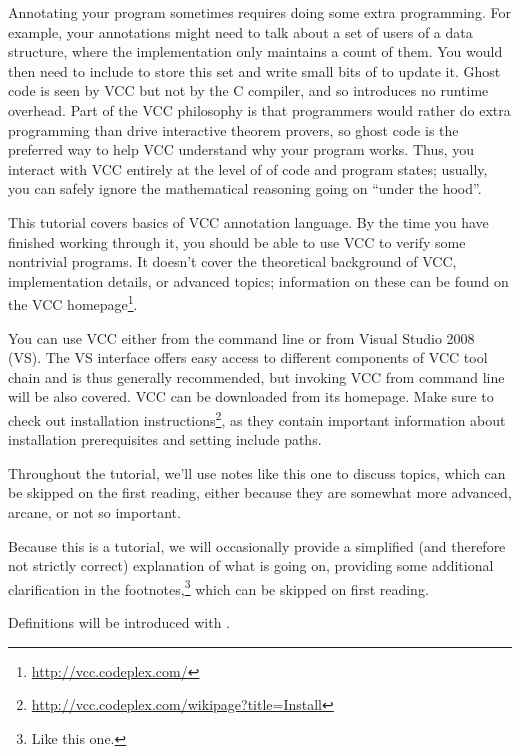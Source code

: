 Annotating your program sometimes requires doing some extra
programming.  For example, your annotations might need to talk about a
set of users of a data structure, where the implementation only
maintains a count of them.  You would then need to include  to store this set and write small bits of  to
update it.  Ghost code is seen by VCC but not by the C compiler, and
so introduces no runtime overhead. Part of the VCC philosophy is that
programmers would rather do extra programming than drive interactive
theorem provers, so ghost code is the preferred way to help VCC
understand why your program works.  Thus, you interact with VCC
entirely at the level of of code and program states; usually, you can
safely ignore the mathematical reasoning going on ``under the hood''.

This tutorial covers basics of VCC annotation language. By the time
you have finished working through it, you should be able to use VCC to
verify some nontrivial programs. It doesn't cover the theoretical
background of VCC, implementation details, or advanced topics;
information on these can be found on the VCC
homepage\footnote{\url{http://vcc.codeplex.com/}}.


You can use VCC either from the command line or from Visual Studio
2008 (VS).
The VS interface offers easy access to different components of
VCC tool chain and is thus generally recommended,
but invoking VCC from command line will be also covered.
VCC can be downloaded from its homepage.
Make sure to check out installation instructions\footnote{\url{http://vcc.codeplex.com/wikipage?title=Install}},
as they contain important information about installation prerequisites 
and setting include paths.


\begin{note}
  Throughout the tutorial, we'll use notes like this one to discuss
  topics, which can be skipped on the first reading, either because
  they are somewhat more advanced, arcane, or not so important.

  Because this is a tutorial, we will occasionally provide a simplified (and
  therefore not strictly correct) explanation of what is going on, providing
  some additional clarification in the footnotes,\footnote{Like this one.}
  which can be skipped on first reading.

  Definitions will be introduced with .
\end{note}

